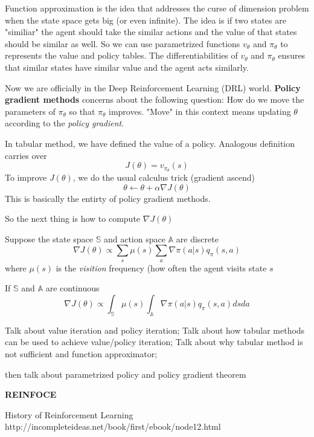 \documentclass{article}
\begin{document}
Function approximation is the idea that addresses the curse of dimension
problem when the state space gets big (or even infinite). The idea is 
if two states are "similiar" the agent should take the similar actions 
and the value of that states should be similar as well. So we can use
parametrized functions $v_{\theta}$ and $\pi_{\theta}$ to represents 
the value and policy tables. The differentiabilities of $v_{\theta}$ 
and $\pi_{\theta}$ ensures that similar states have similar value and 
the agent acts similarly. 

Now we are officially in the Deep Reinforcement Learning (DRL) world. 
\textbf{Policy gradient methods} concerns about the following question:
How do we move the parameters of $\pi_{\theta}$ so that $\pi_{\theta}$
improves. "Move" in this context means updating $\theta$ according to 
the \emph{policy gradient}. 

In tabular method, we have defined the value of a policy. Analogous 
definition carries over
\[
    J(\theta) = v_{\pi_{\theta}}(s)
\]
To improve $J(\theta)$, we do the usual calculus trick (gradient ascend)
\[
    \theta \leftarrow \theta + \alpha \nabla J(\theta)
\]
This is basically the entirty of policy gradient methods.

So the next thing is how to compute $\nabla J(\theta)$ 


\begin{theorem}
Suppose the state space $\mathbb{S}$ and action space $\mathbb{A}$ 
are discrete
\[
    \nabla J(\theta) \propto \sum_{s}\mu(s)\sum_{a} 
    \nabla \pi(a|s)q_{\pi}(s, a)
\]
where $\mu(s)$ is the \emph{visition} frequency (how often the 
agent visits state $s$

If $\mathbb{S}$ and $\mathbb{A}$ are continuous
\[
    \nabla J(\theta) \propto \int_{\mathbb{S}}\mu(s)\int_{\mathbb{A}} 
    \nabla\pi(a|s)q_{\pi}(s, a) dsda
\]
\end{theorem}



Talk about value iteration and policy iteration;
Talk about how tabular methods can be used to achieve
value/policy iteration;
Talk about why tabular method is not sufficient and function 
approximator;

then talk about parametrized policy and policy gradient theorem 



\textbf{REINFOCE}



History of Reinforcement Learning
http://incompleteideas.net/book/first/ebook/node12.html
\end{document}
